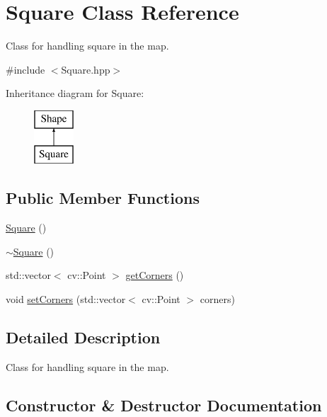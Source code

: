 \hypertarget{class_square}{}\section{Square Class Reference}
\label{class_square}


Class for handling square in the map.  




{\ttfamily \#include $<$Square.\+hpp$>$}

Inheritance diagram for Square\+:\begin{figure}[H]
\begin{center}
\leavevmode
\includegraphics[height=2.000000cm]{class_square}
\end{center}
\end{figure}
\subsection*{Public Member Functions}
\begin{DoxyCompactItemize}
\item 
\mbox{\hyperlink{class_square_a3dc7ff9aefc2725172b5d3153973d243}{Square}} ()
\item 
\mbox{\hyperlink{class_square_a90af7ce1060cff7b717ceddb333846b8}{$\sim$\+Square}} ()
\item 
std\+::vector$<$ cv\+::\+Point $>$ \mbox{\hyperlink{class_square_a53b1e1223e97676db711dd75f2daa508}{get\+Corners}} ()
\item 
void \mbox{\hyperlink{class_square_a84c4995b49318b5191a4fe3739e4f081}{set\+Corners}} (std\+::vector$<$ cv\+::\+Point $>$ corners)
\end{DoxyCompactItemize}


\subsection{Detailed Description}
Class for handling square in the map. 

\subsection{Constructor \& Destructor Documentation}
\mbox{\label{class_square_a3dc7ff9aefc2725172b5d3153973d243}} 
